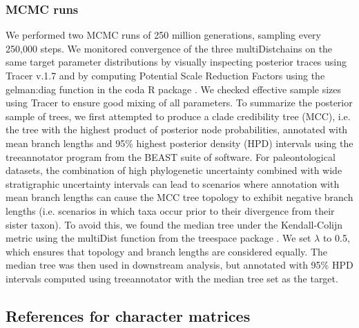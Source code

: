 \documentclass[a4paper, 12pt]{article}
\begin{document}
\subsubsection{MCMC runs}

We performed two MCMC runs of 250 million generations, sampling every 250,000 steps. We monitored convergence of the three multiDistchains on the same target parameter distributions by visually inspecting posterior traces using Tracer v.1.7 and by computing Potential Scale Reduction Factors \citep{gelman1992inference} using the gelman:diag function in the coda R package \citep{plummer2006coda}. We checked effective sample sizes using Tracer to ensure good mixing of all parameters. To summarize the posterior sample of trees, we first attempted to produce a clade credibility tree (MCC), i.e. the tree with the highest product of posterior node probabilities, annotated with mean branch lengths and 95\% highest posterior density (HPD) intervals using the treeannotator program from the BEAST suite of software. For paleontological datasets, the combination of high phylogenetic uncertainty combined with wide stratigraphic uncertainty intervals can lead to scenarios where annotation with mean branch lengths can cause the MCC tree topology to exhibit negative branch lengths (i.e. scenarios in which taxa occur prior to their divergence from their sister taxon). To avoid this, we found the median tree under the Kendall-Colijn metric using the multiDist function from the treespace package \citep{jombart2017treespace}. We set $\lambda$ to 0.5, which ensures that topology and branch lengths are considered equally. The median tree was then used in downstream analysis, but annotated with 95\% HPD intervals computed using treeannotator with the median tree set as the target.    

\newpage
\subsection{References for character matrices}\label{sec:refs1}
\end{document}
